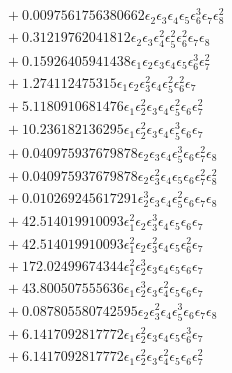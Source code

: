 \documentclass[10pt]{article}
\begin{document}
\begin{align*}
&{}  + 0.0097561756380662 \epsilon_{2} \epsilon_{3} \epsilon_{4} \epsilon_{5} \epsilon_{6}^{3} \epsilon_{7} \epsilon_{8}^{2} \\
&{}  + 0.31219762041812 \epsilon_{2} \epsilon_{3} \epsilon_{4}^{2} \epsilon_{5}^{2} \epsilon_{6}^{2} \epsilon_{7} \epsilon_{8} \\
&{}  + 0.15926405941438 \epsilon_{1} \epsilon_{2} \epsilon_{3} \epsilon_{4} \epsilon_{5} \epsilon_{6}^{3} \epsilon_{7}^{2} \\
&{}  + 1.274112475315 \epsilon_{1} \epsilon_{2} \epsilon_{3}^{2} \epsilon_{4} \epsilon_{5}^{2} \epsilon_{6}^{2} \epsilon_{7} \\
&{}  + 5.1180910681476 \epsilon_{1} \epsilon_{2}^{2} \epsilon_{3} \epsilon_{4} \epsilon_{5}^{2} \epsilon_{6} \epsilon_{7}^{2} \\
&{}  + 10.236182136295 \epsilon_{1} \epsilon_{2}^{2} \epsilon_{3} \epsilon_{4} \epsilon_{5}^{3} \epsilon_{6} \epsilon_{7} \\
&{}  + 0.040975937679878 \epsilon_{2} \epsilon_{3} \epsilon_{4} \epsilon_{5}^{3} \epsilon_{6} \epsilon_{7}^{2} \epsilon_{8} \\
&{}  + 0.040975937679878 \epsilon_{2} \epsilon_{3}^{2} \epsilon_{4} \epsilon_{5} \epsilon_{6} \epsilon_{7}^{2} \epsilon_{8}^{2} \\
&{}  + 0.010269245617291 \epsilon_{2}^{3} \epsilon_{3} \epsilon_{4} \epsilon_{5}^{2} \epsilon_{6} \epsilon_{7} \epsilon_{8} \\
&{}  + 42.514019910093 \epsilon_{1}^{2} \epsilon_{2} \epsilon_{3}^{3} \epsilon_{4} \epsilon_{5} \epsilon_{6} \epsilon_{7} \\
&{}  + 42.514019910093 \epsilon_{1}^{2} \epsilon_{2} \epsilon_{3}^{2} \epsilon_{4} \epsilon_{5} \epsilon_{6}^{2} \epsilon_{7} \\
&{}  + 172.02499674344 \epsilon_{1}^{2} \epsilon_{2}^{3} \epsilon_{3} \epsilon_{4} \epsilon_{5} \epsilon_{6} \epsilon_{7} \\
&{}  + 43.800507555636 \epsilon_{1} \epsilon_{2}^{3} \epsilon_{3} \epsilon_{4}^{2} \epsilon_{5} \epsilon_{6} \epsilon_{7} \\
&{}  + 0.087805580742595 \epsilon_{2} \epsilon_{3}^{2} \epsilon_{4} \epsilon_{5}^{3} \epsilon_{6} \epsilon_{7} \epsilon_{8} \\
&{}  + 6.1417092817772 \epsilon_{1} \epsilon_{2}^{2} \epsilon_{3} \epsilon_{4} \epsilon_{5} \epsilon_{6}^{3} \epsilon_{7} \\
&{}  + 6.1417092817772 \epsilon_{1} \epsilon_{2}^{2} \epsilon_{3} \epsilon_{4}^{2} \epsilon_{5} \epsilon_{6} \epsilon_{7}^{2} \\

\end{align*}
\end{document}
